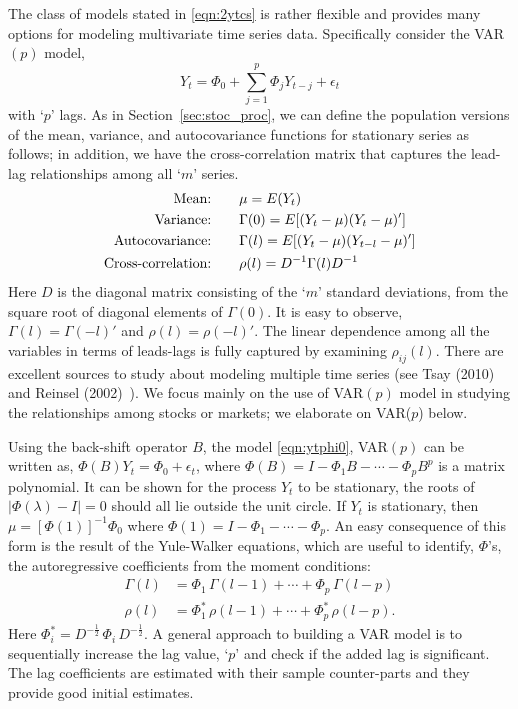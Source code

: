 The class of models stated in \eqref{eqn:2ytcs} is rather flexible and provides many options for modeling multivariate time series data. Specifically consider the VAR$(p)$ model,
	\begin{equation} \label{eqn:ytphi0}
	Y_{t} = \Phi_0 + \sum_{j=1}^{p} \Phi_jY_{t-j} + \epsilon_t 
	\end{equation}
with `$p$' lags. As in Section~\ref{sec:stoc_proc}, we can define the population versions of the mean, variance, and autocovariance functions for stationary series as follows; in addition, we have the cross-correlation matrix that captures the lead-lag relationships among all `$m$' series.
	\begin{equation} \label{eq:meanvarianceauto}
        \begin{split}
	\text{Mean:\qquad} & \mu= E(Y_t) \\
	\text{Variance:\qquad} & \Gamma(0)= E[(Y_t - \mu)(Y_t - \mu)'] \\
	\text{Autocovariance:\qquad} & \Gamma(l)= E[(Y_t - \mu)(Y_{t-l} - \mu)'] \\
	\text{Cross-correlation:\qquad} & \rho(l) = D^{-1}\Gamma(l) D^{-1}
        \end{split}
        \end{equation}
Here $D$ is the diagonal matrix consisting of the `$m$' standard deviations, from the square root of diagonal elements of $\Gamma(0)$. It is easy to observe,  $\Gamma(l)= \Gamma(-l)'$ and $\rho(l)= \rho(-l)'$. The linear dependence among all the variables in terms of leads-lags is fully captured by examining $\rho_{ij}(l)$. There are excellent sources to study about modeling multiple time series (see Tsay (2010)~\cite{tsay} and Reinsel (2002)~\cite{2002reinsel}). We focus mainly on the use of  VAR$(p)$ model in studying the relationships among stocks or markets; we elaborate on VAR($p$) below.


Using the back-shift operator $B$, the model \eqref{eqn:ytphi0}, VAR$(p)$ can be written as, $ \Phi(B)Y_t= \Phi_0 + \epsilon_t$, where $\Phi(B)= I - \Phi_1 B - \cdots - \Phi_p B^p$ is a matrix polynomial. It can be shown for the process $Y_t$ to be stationary, the roots of $\lvert \Phi(\lambda)-I \rvert= 0$ should all lie outside the unit circle. If $Y_t$ is stationary, then $\mu= [\Phi(1)]^{-1} \Phi_0$ where $\Phi(1)= I - \Phi_1 - \cdots - \Phi_p$. An easy consequence of this form is the result of the Yule-Walker equations, which are useful to identify, $\Phi$'s, the autoregressive coefficients from the moment conditions:
	\begin{equation} \label{eqn:2gammarho}
	\begin{split}
	\Gamma(l)&= \Phi_1 \,\Gamma(l-1) +\cdots + \Phi_p\, \Gamma(l-p) \\
	\rho(l)&= \Phi_1^* \,\rho(l-1) + \cdots + \Phi_p^* \, \rho(l-p).
	\end{split}
	\end{equation}
Here $\Phi_i^*= D^{-\frac{1}{2}} \,\Phi_i\, D^{-\frac{1}{2}}$. A general approach to building a VAR model is to sequentially increase the lag value, `$p$' and check if the added lag is significant. The lag coefficients are estimated with their sample counter-parts and they provide good initial estimates. 


